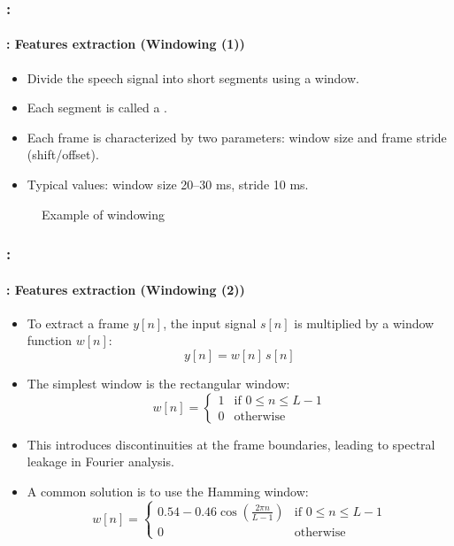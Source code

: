 \documentclass[xcolor=table]{beamer}
\begin{document}
\begin{frame}
	\frametitle{\insertshortsubtitle: \insertsection}
	\framesubtitle{\insertsubsection: Features extraction (Windowing (1))}
	
	\begin{itemize}
		\item Divide the speech signal into short segments using a window.
		\item Each segment is called a .
		\item Each frame is characterized by two parameters: window size and frame stride (shift/offset).
		\item Typical values: window size 20--30 ms, stride 10 ms.
	\end{itemize}
	
	\begin{figure}
		\centering
		\caption{Example of windowing \cite{2020-jurafsky-martin}}
	\end{figure}
	
\end{frame}

\begin{frame}
	\frametitle{\insertshortsubtitle: \insertsection}
	\framesubtitle{\insertsubsection: Features extraction (Windowing (2))}
	
	\begin{itemize}
		\item To extract a frame $y[n]$, the input signal $s[n]$ is multiplied by a window function $w[n]$:
		\[
		y[n] = w[n]\,s[n]
		\]
		\item The simplest window is the rectangular window:
		\[
		w[n] = \begin{cases}
			1 & \text{if } 0 \le n \le L-1 \\
			0 & \text{otherwise}
		\end{cases}
		\]
		\item This introduces discontinuities at the frame boundaries, leading to spectral leakage in Fourier analysis.
		\item A common solution is to use the Hamming window:
		\[
		w[n] = \begin{cases}
			0.54 - 0.46 \cos \left(\frac{2\pi n}{L-1}\right) & \text{if } 0 \le n \le L-1 \\
			0 & \text{otherwise}
		\end{cases}
		\]
	\end{itemize}
	
\end{frame}
\end{document}

